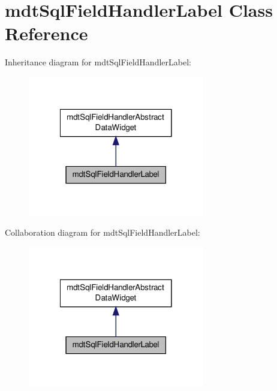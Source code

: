 \hypertarget{classmdt_sql_field_handler_label}{\section{mdt\-Sql\-Field\-Handler\-Label Class Reference}
\label{classmdt_sql_field_handler_label}
}


Inheritance diagram for mdt\-Sql\-Field\-Handler\-Label\-:
\nopagebreak
\begin{figure}[H]
\begin{center}
\leavevmode
\includegraphics[width=218pt]{classmdt_sql_field_handler_label__inherit__graph}
\end{center}
\end{figure}


Collaboration diagram for mdt\-Sql\-Field\-Handler\-Label\-:
\nopagebreak
\begin{figure}[H]
\begin{center}
\leavevmode
\includegraphics[width=218pt]{classmdt_sql_field_handler_label__coll__graph}
\end{center}
\end{figure}
